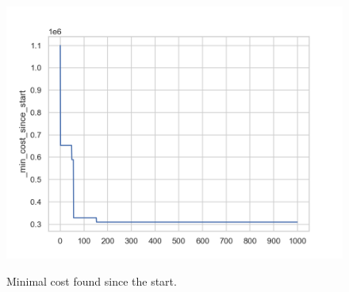 \begin{figure}[h]
	\begin{centering}
		{\includegraphics[scale=0.6]{figures/experiments/1000_iter/min_cost_1000.png}}
		\caption{Minimal cost found since the start.}
		\label{fig:min_cost_1000}
	\end{centering}
\end{figure}
